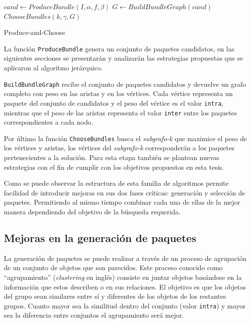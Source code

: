 \begin{center}
	\begin{algorithm}[H]
	\DontPrintSemicolon
	\SetAlgoLined
		$cand \leftarrow ProduceBundle(I,\alpha,f,\beta)$\;
		$G \leftarrow BuildBundleGraph(cand)$\;
		\Return $ChooseBundles(k,\gamma,G)$\;
	\caption{Produce-and-Choose}\label{alg:PAC}
	\end{algorithm}
\end{center}

La función \texttt{ProduceBundle} genera un conjunto de paquetes candidatos, en las siguientes secciones se presentarán y analizarán las estrategias propuestas que se aplicaron al algoritmo jerárquico.

\texttt{BuildBundleGraph} recibe el conjunto de paquetes candidatos y devuelve un grafo completo con peso en las aristas y en los vértices. Cada vértice representa un paquete del conjunto de candidatos y el peso del vértice es el valor \texttt{intra}, mientras que el peso de las aristas representa el valor \texttt{inter} entre los paquetes correspondientes a cada nodo. 

Por último la función \texttt{ChooseBundles} busca el \textit{subgrafo-k} que maximice el peso de los vértices y aristas, los vértices del \textit{subgrafo-k} corresponderán a los paquetes pertenecientes a la solución. Para esta etapa también se plantean nuevas estrategias con el fin de cumplir con los objetivos propuestos en esta tesis.

Como se puede observar la estructura de esta familia de algoritmos permite facilidad de introducir mejoras en sus dos fases críticas: generación y selección de paquetes. Permitiendo al mismo tiempo combinar cada una de ellas de la mejor manera dependiendo del objetivo de la búsqueda requerida.

\subsection{Mejoras en la generación de paquetes}
La generación de paquetes se puede realizar a través de un proceso de agrupación de un conjunto de objetos que son parecidos. Este proceso conocido como ``agrupamiento'' (\textit{clustering} en inglés) \cite{wiki:clustering} consiste en juntar objetos basándose en la información que estos describen o en sus relaciones. El objetivo es que los objetos del grupo sean similares entre sí y diferentes de los objetos de los restantes grupos. Cuanto mayor sea la similitud dentro del conjunto (valor \texttt{intra}) y mayor sea la diferencia entre conjuntos el agrupamiento será mejor.

